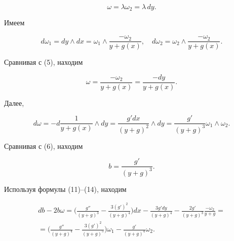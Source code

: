 \begin{equation} 


\omega=\lambda\omega_2=\lambda\,dy. 


\end{equation} 


Имеем 


$$ 


d\omega_1=dy\wedge dx=\omega_1\wedge 


\frac{-\omega_2}{y+g(x)},\quad 


d\omega_2=\omega_2\wedge 


\frac{-\omega_2}{y+g(x)}. 


$$ 


Сравнивая с (5), находим 


\begin{equation} 


\omega=\frac{-\omega_2}{y+g(x)}=\frac{-dy}{y+g(x)}. 


\end{equation} 


Далее, 


$$ 


d\omega=-d\frac{1}{y+g(x)}\wedge dy= 


\frac{g' dx}{(y+g)^2}\wedge dy= 


\frac{g'}{(y+g)^3}\omega_1\wedge\omega_2. 


$$ 


Сравнивая с (6), находим 


\begin{equation} 


b=\frac{g'}{(y+g)^3}. 


\end{equation} 


Используя формулы (11)--(14), находим 


\begin{multline*} 


d b-2b\omega=\bigg(\frac{g''}{(y+g)^3}-\frac{3(g')^2}{(y+g)^4} \bigg)dx 


-\frac{3g' dy}{(y+g)^4}-\frac{2g'}{(y+g)^3} 


\frac{-\omega_2}{y+g}= \\


%


=\bigg(\frac{g''}{(y+g)^4}-\frac{3(g')^2}{(y+g)^5} \bigg)\omega_1 


-\frac{g'}{(y+g)^4}\omega_2. 


\end{multline*}  


